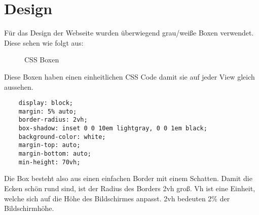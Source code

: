 \section{Design}
\label{design}

Für das Design der Webseite wurden überwiegend grau/weiße Boxen verwendet. Diese sehen wie folgt aus:

\begin{figure}[H]
    \begin{center}
      \caption{CSS Boxen}
    \end{center}
\end{figure}

Diese Boxen haben einen einheitlichen CSS Code damit sie auf jeder View gleich aussehen.

\begin{lstlisting}
    display: block;
    margin: 5% auto;
    border-radius: 2vh;
    box-shadow: inset 0 0 10em lightgray, 0 0 1em black;
    background-color: white;
    margin-top: auto;
    margin-bottom: auto;
    min-height: 70vh;
\end{lstlisting}

Die Box besteht also aus einen einfachen Border mit einem Schatten. Damit die Ecken schön rund sind,
ist der Radius des Borders 2vh groß. Vh ist eine Einheit, welche sich auf die Höhe des Bildschirmes 
anpasst. 2vh bedeuten 2\% der Bildschirmhöhe. 